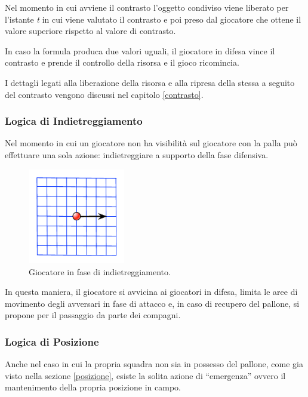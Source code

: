 \documentclass[aps,letterpaper,10pt]{article}
\begin{document}
Nel momento in cui avviene il contrasto l'oggetto condiviso viene liberato per l'istante \emph{t} in cui viene valutato il contrasto e poi preso dal giocatore che ottene il valore superiore rispetto al valore di contrasto. \vspace{3mm}

In caso la formula produca due valori uguali, il giocatore in difesa vince il contrasto e prende il controllo della risorsa e il gioco ricomincia. \vspace{3mm}

I dettagli legati alla liberazione della risorsa e alla ripresa della stessa a seguito del contrasto vengono discussi nel capitolo \ref{contrasto}.

\subsubsection{Logica di Indietreggiamento}

Nel momento in cui un giocatore non ha visibilit\`a sul giocatore con la palla pu\`o effettuare una sola azione: indietreggiare a supporto della fase difensiva.

\begin{figure}[H]
	\begin{center}
		\includegraphics[width=160px]{images/return.pdf}
	\end{center}
\caption{Giocatore in fase di indietreggiamento.}
\end{figure}

In questa maniera, il giocatore si avvicina ai giocatori in difesa, limita le aree di movimento degli avversari in fase di attacco e, in caso di recupero del pallone, si propone per il passaggio da parte dei compagni.

\subsubsection{Logica di Posizione}

Anche nel caso in cui la propria squadra non sia in possesso del pallone, come gia visto nella sezione \ref{posizione}, esiste la solita azione di ``emergenza'' ovvero il mantenimento della propria posizione in campo.
\end{document}
